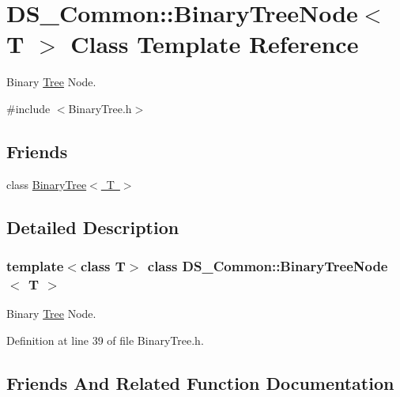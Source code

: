 \hypertarget{class_d_s___common_1_1_binary_tree_node_3_01_t_01_4}{}\section{D\+S\+\_\+\+Common\+:\+:Binary\+Tree\+Node$<$ T $>$ Class Template Reference}
\label{class_d_s___common_1_1_binary_tree_node_3_01_t_01_4}


Binary \mbox{\hyperlink{class_tree}{Tree}} Node.  




{\ttfamily \#include $<$Binary\+Tree.\+h$>$}

\subsection*{Friends}
\begin{DoxyCompactItemize}
\item 
class \mbox{\hyperlink{class_d_s___common_1_1_binary_tree_node_3_01_t_01_4_a730de1b2d6b429de119b29edb7b6607b}{Binary\+Tree$<$ T $>$}}
\end{DoxyCompactItemize}


\subsection{Detailed Description}
\subsubsection*{template$<$class T$>$\newline
class D\+S\+\_\+\+Common\+::\+Binary\+Tree\+Node$<$ T $>$}

Binary \mbox{\hyperlink{class_tree}{Tree}} Node. 

Definition at line 39 of file Binary\+Tree.\+h.



\subsection{Friends And Related Function Documentation}
\mbox{\label{class_d_s___common_1_1_binary_tree_node_3_01_t_01_4_a730de1b2d6b429de119b29edb7b6607b}} 

